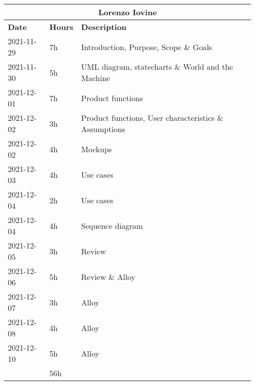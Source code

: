 \begin{table}[H]
    \centering
    \begin{tabular}{|l|l|l|}
        \multicolumn{3}{c}{\textbf{Lorenzo Iovine}}                   \\
        \hline
        \textbf{Date} & \textbf{Hours} & \textbf{Description}          \\\hline
        2021-11-29    & 7h             & Introduction, Purpose, Scope \& Goals                  \\\hline
        2021-11-30    & 5h             & UML diagram, statecharts \& World and the Machine      \\\hline
        2021-12-01    & 7h             & Product functions                                      \\\hline
        2021-12-02    & 3h             & Product functions, User characteristics \& Assumptions \\\hline
        2021-12-02    & 4h             & Mockups                                                \\\hline
        2021-12-03    & 4h             & Use cases                                              \\\hline
        2021-12-04    & 2h             & Use cases                                              \\\hline
        2021-12-04    & 4h             & Sequence diagram                                       \\\hline
        2021-12-05    & 3h             & Review                                                 \\\hline
        2021-12-06    & 5h             & Review \& Alloy                                        \\\hline
        2021-12-07    & 3h             & Alloy                                                  \\\hline
        2021-12-08    & 4h             & Alloy                                                  \\\hline
        2021-12-10    & 5h             & Alloy                                                  \\\hline\hline
                      & 56h            &                                                        \\\hline
    \end{tabular}
\end{table}
\bigskip

